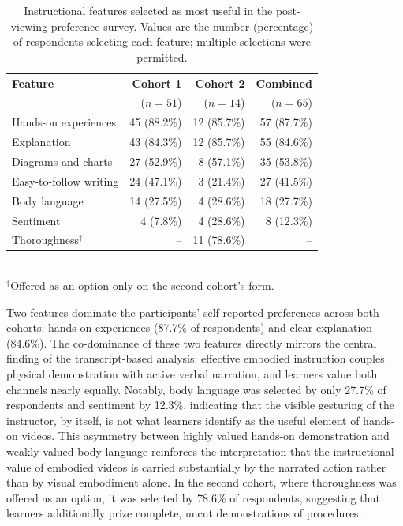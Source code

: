 \documentclass[fleqn,10pt]{JLA_article} %
\begin{document}
\begin{table}[h!]
    \centering
    \caption{Instructional features selected as most useful in the post-viewing preference survey. Values are the number (percentage) of respondents selecting each feature; multiple selections were permitted.}
    \begin{tabular}{l r r r}
        \toprule
        \textbf{Feature} & \textbf{Cohort 1} & \textbf{Cohort 2} & \textbf{Combined} \\
        & ($n = 51$) & ($n = 14$) & ($n = 65$) \\
        \midrule
        Hands-on experiences & 45 (88.2\%) & 12 (85.7\%) & 57 (87.7\%) \\
        Explanation & 43 (84.3\%) & 12 (85.7\%) & 55 (84.6\%) \\
        Diagrams and charts & 27 (52.9\%) & 8 (57.1\%) & 35 (53.8\%) \\
        Easy-to-follow writing & 24 (47.1\%) & 3 (21.4\%) & 27 (41.5\%) \\
        Body language & 14 (27.5\%) & 4 (28.6\%) & 18 (27.7\%) \\
        Sentiment & 4 (7.8\%) & 4 (28.6\%) & 8 (12.3\%) \\
        Thoroughness$^{\dagger}$ & -- & 11 (78.6\%) & -- \\
        \bottomrule
    \end{tabular}
    \\[2pt]
    {\footnotesize $^{\dagger}$Offered as an option only on the second cohort's form.}
    \label{tab:survey_features}
\end{table}

Two features dominate the participants' self-reported preferences across both cohorts: hands-on experiences (87.7\% of respondents) and clear explanation (84.6\%). The co-dominance of these two features directly mirrors the central finding of the transcript-based analysis: effective embodied instruction couples physical demonstration with active verbal narration, and learners value both channels nearly equally. Notably, body language was selected by only 27.7\% of respondents and sentiment by 12.3\%, indicating that the visible gesturing of the instructor, by itself, is not what learners identify as the useful element of hands-on videos. This asymmetry between highly valued hands-on demonstration and weakly valued body language reinforces the interpretation that the instructional value of embodied videos is carried substantially by the narrated action rather than by visual embodiment alone. In the second cohort, where thoroughness was offered as an option, it was selected by 78.6\% of respondents, suggesting that learners additionally prize complete, uncut demonstrations of procedures.
\end{document}
